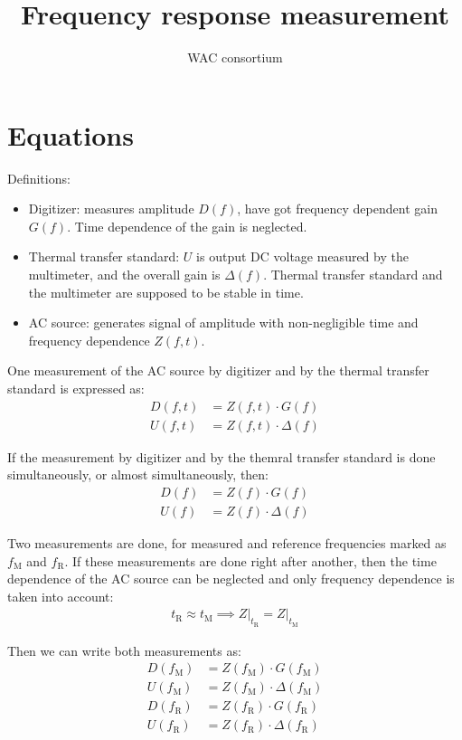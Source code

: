 \documentclass{article}
\title{Frequency response measurement}
\author{WAC consortium}
\begin{document}
\maketitle

\section*{Equations}
Definitions:
\begin{itemize}
	\item Digitizer: measures amplitude $D(f)$, have got frequency dependent gain $G(f)$. Time dependence of the gain is neglected.
	\item Thermal transfer standard: $U$ is output DC voltage measured by the multimeter, and the overall gain is $\Delta(f)$. Thermal transfer standard and the multimeter are supposed to be stable in time.
	\item AC source: generates signal of amplitude with non-negligible time and frequency dependence $Z(f,t)$.
\end{itemize}

One measurement of the AC source by digitizer and by the thermal transfer
standard is expressed as:
\begin{align}
	D(f, t) & = Z(f, t) \cdot G(f)      \\
	U(f, t) & = Z(f, t) \cdot \Delta(f)
\end{align}

If the measurement by digitizer and by the themral transfer standard is done simultaneously, or almost simultaneously, then:
\begin{align}
	D(f) & = Z(f) \cdot G(f)      \\
	U(f) & = Z(f) \cdot \Delta(f)
\end{align}


Two measurements are done, for measured and reference frequencies marked as
$f_\text{M}$ and $f_\text{R}$. If these measurements are done right after
another, then the time dependence of the AC source can be neglected and only
frequency dependence is taken into account:
\begin{align}
	t_\text{R} \approx t_\text{M} \implies Z\big|_{t_\text{R}} = Z\big|_{t_\text{M}}
\end{align}

Then we can write both measurements as:
\begin{align}
	D(f_\text{M}) & = Z(f_\text{M}) \cdot      G(f_\text{M}) \\
	U(f_\text{M}) & = Z(f_\text{M}) \cdot \Delta(f_\text{M}) \\
	D(f_\text{R}) & = Z(f_\text{R}) \cdot      G(f_\text{R}) \\
	U(f_\text{R}) & = Z(f_\text{R}) \cdot \Delta(f_\text{R})
\end{align}
\end{document}
